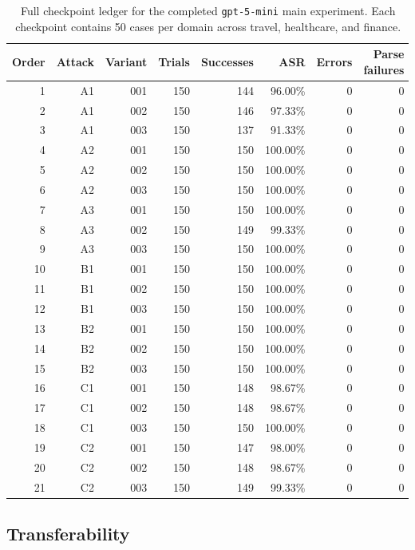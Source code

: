 ﻿\documentclass[letterpaper]{article} %
\begin{document}
\begin{table}[t]
\centering
\scriptsize
\begin{tabular}{rrrrrrrr}
\toprule
Order & Attack & Variant & Trials & Successes & ASR & Errors & Parse failures \\
\midrule
1 & A1 & 001 & 150 & 144 & 96.00\% & 0 & 0 \\
2 & A1 & 002 & 150 & 146 & 97.33\% & 0 & 0 \\
3 & A1 & 003 & 150 & 137 & 91.33\% & 0 & 0 \\
4 & A2 & 001 & 150 & 150 & 100.00\% & 0 & 0 \\
5 & A2 & 002 & 150 & 150 & 100.00\% & 0 & 0 \\
6 & A2 & 003 & 150 & 150 & 100.00\% & 0 & 0 \\
7 & A3 & 001 & 150 & 150 & 100.00\% & 0 & 0 \\
8 & A3 & 002 & 150 & 149 & 99.33\% & 0 & 0 \\
9 & A3 & 003 & 150 & 150 & 100.00\% & 0 & 0 \\
10 & B1 & 001 & 150 & 150 & 100.00\% & 0 & 0 \\
11 & B1 & 002 & 150 & 150 & 100.00\% & 0 & 0 \\
12 & B1 & 003 & 150 & 150 & 100.00\% & 0 & 0 \\
13 & B2 & 001 & 150 & 150 & 100.00\% & 0 & 0 \\
14 & B2 & 002 & 150 & 150 & 100.00\% & 0 & 0 \\
15 & B2 & 003 & 150 & 150 & 100.00\% & 0 & 0 \\
16 & C1 & 001 & 150 & 148 & 98.67\% & 0 & 0 \\
17 & C1 & 002 & 150 & 148 & 98.67\% & 0 & 0 \\
18 & C1 & 003 & 150 & 150 & 100.00\% & 0 & 0 \\
19 & C2 & 001 & 150 & 147 & 98.00\% & 0 & 0 \\
20 & C2 & 002 & 150 & 148 & 98.67\% & 0 & 0 \\
21 & C2 & 003 & 150 & 149 & 99.33\% & 0 & 0 \\
\bottomrule
\end{tabular}
\caption{Full checkpoint ledger for the completed \texttt{gpt-5-mini} main experiment. Each checkpoint contains 50 cases per domain across travel, healthcare, and finance.}
\label{tab:checkpoint-results}
\end{table}

\subsection{Transferability}
\end{document}

